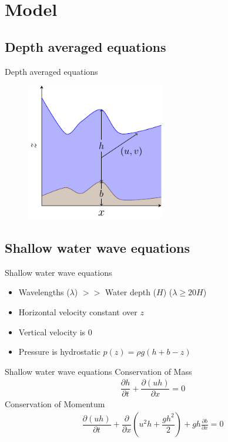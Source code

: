 \documentclass[pdf]{beamer}
\begin{document}
\section{Model}
\subsection{Depth averaged equations}

\begin{frame}{Depth averaged equations}
		\begin{figure}
			\includegraphics[width=6cm]{./Pics/SWWE.pdf}
		\end{figure}
\end{frame}

\subsection{Shallow water wave equations}
\begin{frame}{Shallow water wave equations}
	\begin{itemize}
		\item Wavelengths ($\lambda$) $>>$ Water depth ($H$) ($\lambda \ge 20 H$)
		\smallskip
		\item Horizontal velocity constant over $z$
		\item Vertical velocity is $0$
		\item Pressure is hydrostatic $p(z) = \rho g(h + b - z)$
	\end{itemize}
\end{frame}

\begin{frame}{Shallow water wave equations}
		Conservation of Mass
		\begin{gather*}
		\dfrac{\partial h}{\partial t} + \dfrac{\partial (uh)}{\partial x} = 0
		\end{gather*}
		Conservation of Momentum
		\begin{gather*}
		\dfrac{\partial (uh)}{\partial t} + \dfrac{\partial}{\partial x} \left ( u^2h + \dfrac{gh^2}{2}\right ) + gh \frac{\partial b}{\partial x} = 0 
		\label{eq:Serre_momentum}
		\end{gather*}
\end{frame}
\end{document}
